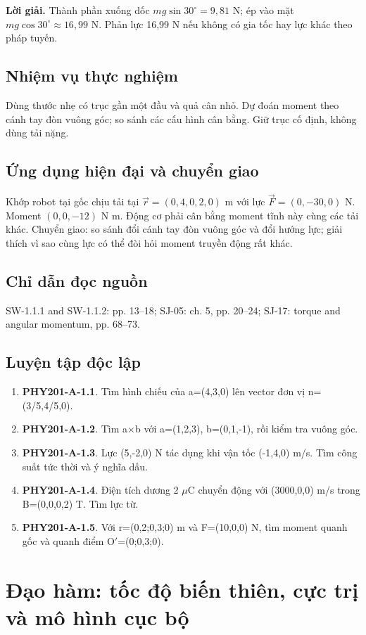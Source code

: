\documentclass[11pt,a4paper,openany]{book}
\begin{document}
\textbf{Lời giải.} Thành phần xuống dốc $mg\sin30^\circ=9{,}81$ N; ép vào mặt $mg\cos30^\circ\approx16{,}99$ N. Phản lực 16,99 N nếu không có gia tốc hay lực khác theo pháp tuyến.
\section{Nhiệm vụ thực nghiệm}
Dùng thước nhẹ có trục gần một đầu và quả cân nhỏ. Dự đoán moment theo cánh tay đòn vuông góc; so sánh các cấu hình cân bằng. Giữ trục cố định, không dùng tải nặng.
\section{Ứng dụng hiện đại và chuyển giao}
Khớp robot tại gốc chịu tải tại $\vec r=(0{,}4,0{,}2,0)$ m với lực $\vec F=(0,-30,0)$ N. Moment $(0,0,-12)$ N m. Động cơ phải cân bằng moment tĩnh này cùng các tải khác. Chuyển giao: so sánh đổi cánh tay đòn vuông góc và đổi hướng lực; giải thích vì sao cùng lực có thể đòi hỏi moment truyền động rất khác.
\section{Chỉ dẫn đọc nguồn}
SW-1.1.1 and SW-1.1.2: pp. 13–18; SJ-05: ch. 5, pp. 20–24; SJ-17: torque and angular momentum, pp. 68–73.
\section{Luyện tập độc lập}
\begin{enumerate}
\item \textbf{PHY201-A-1.1}. Tìm hình chiếu của a=(4,3,0) lên vector đơn vị n=(3/5,4/5,0).
\item \textbf{PHY201-A-1.2}. Tìm a\ensuremath{\times}b với a=(1,2,3), b=(0,1,-1), rồi kiểm tra vuông góc.
\item \textbf{PHY201-A-1.3}. Lực (5,-2,0) N tác dụng khi vận tốc (-1,4,0) m/s. Tìm công suất tức thời và ý nghĩa dấu.
\item \textbf{PHY201-A-1.4}. Điện tích dương 2 \ensuremath{\mu}C chuyển động với (3000,0,0) m/s trong B=(0,0,0,2) T. Tìm lực từ.
\item \textbf{PHY201-A-1.5}. Với r=(0,2;0,3;0) m và F=(10,0,0) N, tìm moment quanh gốc và quanh điểm O\ensuremath{\prime}=(0;0,3;0).
\end{enumerate}
\chapter{Đạo hàm: tốc độ biến thiên, cực trị và mô hình cục bộ}
\end{document}
